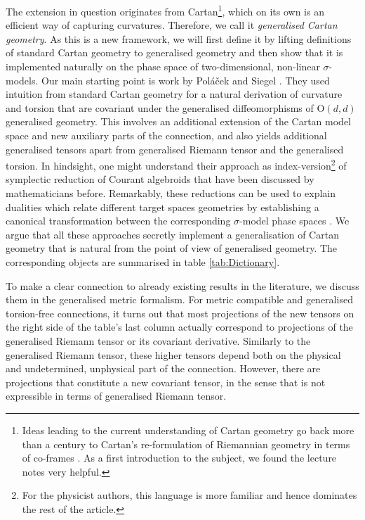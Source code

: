 \documentclass[11pt,a4paper]{article}
\numberwithin{equation}{section}
\begin{document}
The extension in question originates from Cartan\footnote{Ideas leading to the current understanding of Cartan geometry go back more than a century to Cartan's re-formulation of Riemannian geometry in terms of co-frames \cite{Cartan1922}. As a first introduction to the subject, we found the lecture notes \cite{Alexandre2024} %
very helpful.}, which on its own is an efficient way of capturing curvatures. Therefore, we call it \textit{generalised Cartan geometry}. As this is a new framework, we will first define it by lifting definitions of standard Cartan geometry to generalised geometry and then show that it is implemented naturally on the phase space of two-dimensional, non-linear $\sigma$-models. Our main starting point is work by Poláček and Siegel \cite{Polacek:2013nla,Polacek:2017hnq}. They used intuition from standard Cartan geometry for a natural derivation of curvature and torsion that are covariant under the generalised diffeomorphisms of O$(d,d)$ generalised geometry. This involves an additional extension of the Cartan model space and new auxiliary parts of the connection, and also yields additional generalised tensors apart from generalised Riemann tensor and the generalised torsion. In hindsight, one might understand their approach as index-version\footnote{For the physicist authors, this language is more familiar and hence dominates the rest of the article.} of symplectic reduction of Courant algebroids \cite{Bursztyn:2005vwa,Severa:2017oew} that have been discussed by mathematicians before. Remarkably, these reductions can be used to explain dualities which relate different target spaces geometries by establishing a canonical transformation between the corresponding $\sigma$-model phase spaces \cite{Severa:2015hta,Severa:2018pag,Butter:2022iza}. We argue that all these approaches secretly implement a generalisation of Cartan geometry that is natural from the point of view of generalised geometry. The corresponding objects are summarised in table \ref{tab:Dictionary}.

To make a clear connection to already existing results in the literature, we discuss them in the generalised metric formalism. For metric compatible and generalised torsion-free connections, it turns out that most projections of the new tensors on the right side of the table's last column actually correspond to projections of the generalised Riemann tensor or its covariant derivative. Similarly to the generalised Riemann tensor, these higher tensors depend both on the physical and undetermined, unphysical part of the connection. However, there are projections that constitute a new covariant tensor, in the sense that is not expressible in terms of generalised Riemann tensor.
    
\end{document}
